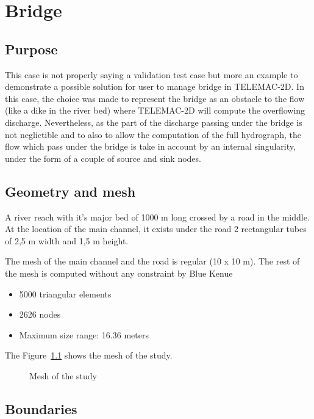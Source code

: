 \chapter{Bridge}
\section{Purpose}

This case is not properly saying a validation test case but more an example to 
demonstrate a possible solution for user to manage bridge in TELEMAC-2D.
In this case, the choice was made to represent the bridge as an obstacle to 
the flow (like a dike in the river bed) where TELEMAC-2D will compute the 
overflowing discharge. Nevertheless, as the part of the discharge passing under 
the bridge is not neglictible and to also to allow the computation of the full 
hydrograph, the flow which pass under the bridge is take in account by an 
internal singularity, under the form of a couple of source and sink nodes.

\section{Geometry and mesh}

A river reach with it's major bed of 1000 m long crossed by a road in the middle. 
At the location of the main channel, it exists under the road 2 rectangular tubes
of 2,5 m width and 1,5 m height.

The mesh of the main channel and the road is regular (10 x 10 m).
The rest of the mesh is computed without any constraint by Blue Kenue

\begin{itemize}
\item  5000 triangular elements
\item  2626 nodes
\item  Maximum size range: 16.36 meters
\end{itemize}

The Figure~\ref{fig:bridge:mesh} shows the mesh of the study.
\begin{figure}
\centering
{}
\caption{Mesh of the study}\label{fig:bridge:mesh}
\end{figure}

\section{Boundaries}

